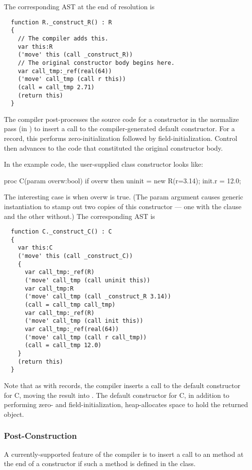 The corresponding AST at the end of resolution is
\begin{verbatim}
  function R._construct_R() : R
  {
    // The compiler adds this.
    var this:R
    ('move' this (call _construct_R))
    // The original constructor body begins here.
    var call_tmp:_ref(real(64))
    ('move' call_tmp (call r this))
    (call = call_tmp 2.71)
    (return this)
  }
\end{verbatim}

The compiler post-processes the source code for a constructor in the normalize pass (in
) to insert a call to the compiler-generated default
constructor.  For a record, this performs zero-initialization followed by
field-initialization.  Control then advances to the code that constituted the original
constructor body.

In the example code, the user-supplied class constructor looks like:
\begin{chapel}
  proc C(param overw:bool)
  {
    if overw then
    {
      uninit = new R(r=3.14);
      init.r = 12.0;
    }
  }
\end{chapel}
The interesting case is when overw is true.  (The param argument causes generic
instantiation to stamp out two copies of this constructor --- one with the 
 clause and the other without.)  The corresponding AST is
\begin{verbatim}
  function C._construct_C() : C
  {
    var this:C
    ('move' this (call _construct_C))
    {
      var call_tmp:_ref(R)
      ('move' call_tmp (call uninit this))
      var call_tmp:R
      ('move' call_tmp (call _construct_R 3.14))
      (call = call_tmp call_tmp)
      var call_tmp:_ref(R)
      ('move' call_tmp (call init this))
      var call_tmp:_ref(real(64))
      ('move' call_tmp (call r call_tmp))
      (call = call_tmp 12.0)
    }
    (return this)
  }
\end{verbatim}
Note that as with records, the compiler inserts a call to the default constructor for C,
moving the result into .  The default constructor for C, in addition to
performing zero- and field-initialization, heap-allocates space to hold the returned object.


\subsubsection{Post-Construction}

A currently-supported feature of the compiler is to insert a call to an 
method at the end of a constructor if such a method is defined in the class.

